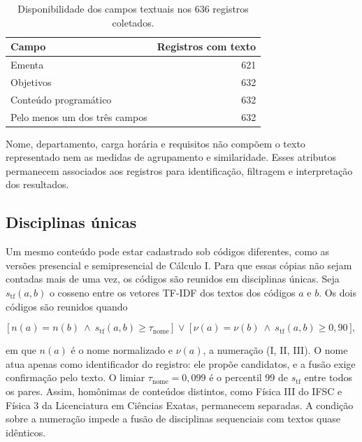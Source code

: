 \documentclass[
  12pt,
  oneside,
  a4paper,
  article,
  brazil
]{USPSC-classe/USPSC}
\begin{document}
\begin{table}[htbp]
  \centering
  \caption{Disponibilidade dos campos textuais nos 636 registros coletados.}
  \label{tab:textos}
  \begin{tabularx}{\linewidth}{>{\raggedright\arraybackslash}X r}
    \toprule
    \textbf{Campo} & \textbf{Registros com texto} \\
    \midrule
    Ementa & 621 \\
    Objetivos & 632 \\
    Conteúdo programático & 632 \\
    Pelo menos um dos três campos & 632 \\
    \bottomrule
  \end{tabularx}
\end{table}

Nome, departamento, carga horária e requisitos não compõem o texto representado
nem as medidas de agrupamento e similaridade. Esses atributos permanecem
associados aos registros para identificação, filtragem e interpretação dos
resultados.

\subsection{Disciplinas únicas}

Um mesmo conteúdo pode estar cadastrado sob códigos diferentes, como as versões
presencial e semipresencial de Cálculo I. Para que essas cópias não sejam
contadas mais de uma vez, os códigos são reunidos em disciplinas únicas. Seja
$s_{\mathrm{tf}}(a,b)$ o cosseno entre os vetores TF-IDF dos textos dos códigos
$a$ e $b$. Os dois códigos são reunidos quando

\begin{equation}
  \bigl[\,n(a)=n(b)\ \wedge\ s_{\mathrm{tf}}(a,b)\geq\tau_{\mathrm{nome}}\,\bigr]
  \ \vee\
  \bigl[\,\nu(a)=\nu(b)\ \wedge\ s_{\mathrm{tf}}(a,b)\geq0{,}90\,\bigr],
  \label{eq:duplicidade}
\end{equation}

em que $n(a)$ é o nome normalizado e $\nu(a)$, a numeração (I, II, III). O nome
atua apenas como identificador do registro: ele propõe candidatos, e a fusão
exige confirmação pelo texto. O limiar $\tau_{\mathrm{nome}}=0{,}099$ é o
percentil 99 de $s_{\mathrm{tf}}$ entre todos os pares. Assim, homônimas de
conteúdos distintos, como Física III do IFSC e Física 3 da Licenciatura em
Ciências Exatas, permanecem separadas. A condição sobre a numeração impede a
fusão de disciplinas sequenciais com textos quase idênticos.
\end{document}
